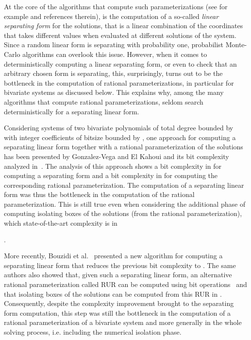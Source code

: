 \documentclass{sig-alternate}
\newcommand{\blue}[1]{\color{blue}#1\color{black}\xspace}
\renewcommand{\blue}[1]{#1\xspace}
\begin{document}
At the core of the algorithms that compute such 
paramete\-rizations (see for example
\cite{ABRW,bostan2003fast,det-jsc-2009,GLS01,VegKah:curve2d:96,Rou99} and references therein), is
the computation of a so-called \emph{linear separating form} for the solutions, that is  a linear combination of the coordinates that takes different values when evaluated at different solutions of the system.
Since a random linear form is
separating with probability one, 
probabilist Monte-Carlo algorithms can overlook this issue.
However, when it comes to deterministically computing a linear separating
  form, or even to check that an arbitrary chosen form is separating, this, surprisingly, turns out to be the bottleneck in the computation of rational parameterizations, in particular for bivariate systems as discussed below. This explains why, among the many algorithms that compute rational parameterizations, seldom search deterministically for a separating linear form. 

Considering systems of two bivariate polynomials of
  total degree bounded by  with integer coefficients of bitsize bounded by
  , one approach for computing a separating linear form together with a rational parameterization of the solutions has been presented by Gonzalez-Vega and El Kahoui \cite{VegKah:curve2d:96} and its bit complexity analyzed in~\cite{det-jsc-2009}. The analysis of this approach shows a bit complexity in  for computing a separating form and a bit complexity in  for computing the corresponding rational parameterization. The computation of a separating linear form was thus the bottleneck in the computation of the rational parameterization.  This is still true even
  when considering the additional phase of computing isolating boxes of the
  solutions (from the rational parameterization), which state-of-the-art
  complexity is in 
   
\blue{\cite[Prop. 35]{bouzidiJSC2014a}}.



More recently, Bouzidi et al.~\blue{\cite{bouzidiJSC2014a}} presented a new
algorithm for computing a separating linear form that reduces the previous bit complexity to
.
The same authors also showed that, given such a
separating linear form, an
alternative rational parameterization called RUR \cite{Rou99} can be computed using
 bit operations~\blue{\cite[Thm. 22]{bouzidiJSC2014a}}
and that isolating boxes
of the solutions can be computed from this RUR in  \cite[Thm. 6.1.2]{bouzidi:thesis}.
Consequently, despite the complexity improvement brought to the separating form computation, this step was still the bottleneck in the computation of a rational parameterization of a bivariate system and more generally in the whole solving process, i.e. including the numerical isolation phase. 
\end{document}
